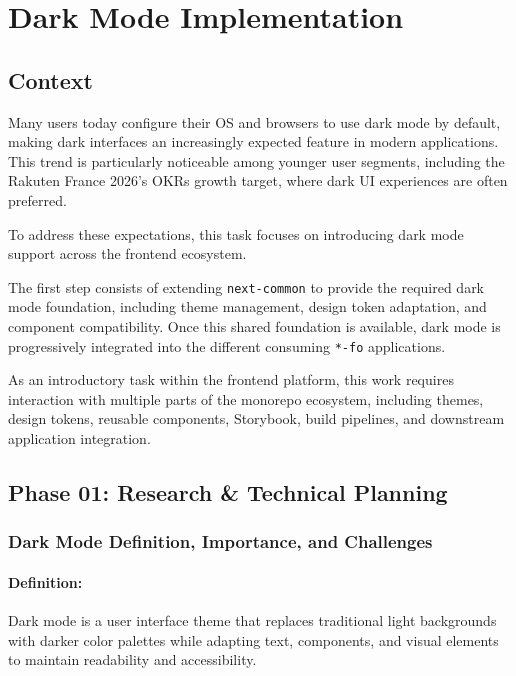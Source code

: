 \section{Dark Mode Implementation}
\label{sec:dark-mode}

\subsection{Context}

Many users today configure their \acf{OS} and browsers to use dark mode by default, making dark interfaces an increasingly expected feature in modern applications. This trend is particularly noticeable among younger user segments, including the Rakuten France 2026's \acf{OKRs} growth target, where dark UI experiences are often preferred.

To address these expectations, this task focuses on introducing dark mode support across the frontend ecosystem.

The first step consists of extending \texttt{next-common} to provide the required dark mode foundation, including theme management, design token adaptation, and component compatibility. Once this shared foundation is available, dark mode is progressively integrated into the different consuming \texttt{*-fo} applications.

As an introductory task within the frontend platform, this work requires interaction with multiple parts of the monorepo ecosystem, including themes, design tokens, reusable components, Storybook, build pipelines, and downstream application integration.

\subsection{Phase 01: Research \& Technical Planning}

\subsubsection{Dark Mode Definition, Importance, and Challenges}

\paragraph{Definition:}

Dark mode is a user interface theme that replaces traditional light backgrounds with darker color palettes while adapting text, components, and visual elements to maintain readability and accessibility.

